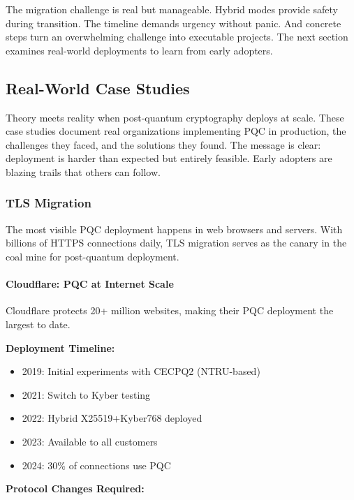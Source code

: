 \documentclass[11pt,a4paper]{article}
\begin{document}
The migration challenge is real but manageable. Hybrid modes provide safety during transition. The timeline demands urgency without panic. And concrete steps turn an overwhelming challenge into executable projects. The next section examines real-world deployments to learn from early adopters.

\subsection{Real-World Case Studies}
\label{sec:case-studies}

Theory meets reality when post-quantum cryptography deploys at scale. These case studies document real organizations implementing PQC in production, the challenges they faced, and the solutions they found. The message is clear: deployment is harder than expected but entirely feasible. Early adopters are blazing trails that others can follow.

\subsubsection{TLS Migration}

The most visible PQC deployment happens in web browsers and servers. With billions of HTTPS connections daily, TLS migration serves as the canary in the coal mine for post-quantum deployment.

\paragraph{Cloudflare: PQC at Internet Scale}

Cloudflare protects 20+ million websites, making their PQC deployment the largest to date.

\textbf{Deployment Timeline:}
\begin{itemize}
    \item 2019: Initial experiments with CECPQ2 (NTRU-based)
    \item 2021: Switch to Kyber testing
    \item 2022: Hybrid X25519+Kyber768 deployed
    \item 2023: Available to all customers
    \item 2024: 30\% of connections use PQC
\end{itemize}

\textbf{Protocol Changes Required:}
\end{document}
